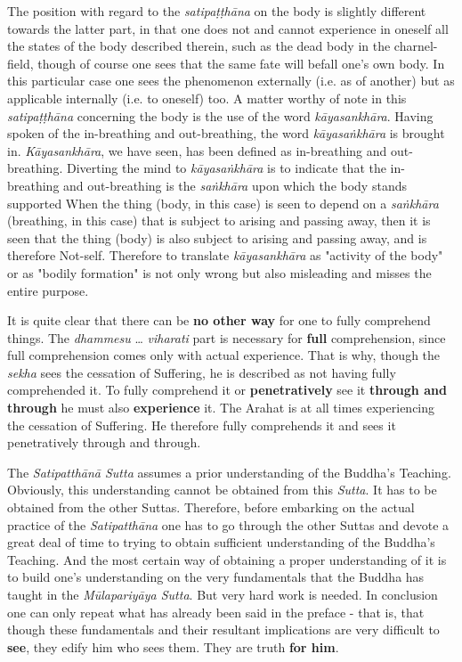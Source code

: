 The position with regard to the \emph{satipaṭṭhāna} on the body is slightly different towards the latter part, in that one does not and cannot experience in oneself all the states of the body described therein, such as the dead body in the charnel-field, though of course one sees that the same fate will befall one's own body. In this particular case one sees the phenomenon externally (i.e. as of another) but as applicable internally (i.e. to oneself) too. A matter worthy of note in this \emph{satipaṭṭhāna} concerning the body is the use of the word \emph{kāyasankhāra}. Having spoken of the in-breathing and out-breathing, the word \emph{kāyasaṅkhāra} is brought in. \emph{Kāyasankhāra}, we have seen, has been defined as in-breathing and out-breathing. Diverting the mind to \emph{kāyasaṅkhāra} is to indicate that the in-breathing and out-breathing is the \emph{saṅkhāra} upon which the body stands supported When the thing (body, in this case) is seen to depend on a \emph{saṅkhāra} (breathing, in this case) that is subject to arising and passing away, then it is seen that the thing (body) is also subject to arising and passing away, and is therefore Not-self. Therefore to translate \emph{kāyasankhāra} as "activity of the body" or as "bodily formation" is not only wrong but also misleading and misses the entire purpose.

It is quite clear that there can be \textbf{no other way} for one to fully comprehend things. The \emph{dhammesu} \ldots\hspace{0pt} \emph{viharati} part is necessary for \textbf{full} comprehension, since full comprehension comes only with actual experience. That is why, though the \emph{sekha} sees the cessation of Suffering, he is described as not having fully comprehended it. To fully comprehend it or \textbf{penetratively} see it \textbf{through and through} he must also \textbf{experience} it. The Arahat is at all times experiencing the cessation of Suffering. He therefore fully comprehends it and sees it penetratively through and through.

\protect\hypertarget{truth-for-him}{}{}The \emph{Satipatthānā Sutta} assumes a prior understanding of the Buddha's Teaching. Obviously, this understanding cannot be obtained from this \emph{Sutta}. It has to be obtained from the other Suttas. Therefore, before embarking on the actual practice of the \emph{Satipatthāna} one has to go through the other Suttas and devote a great deal of time to trying to obtain sufficient understanding of the Buddha's Teaching. And the most certain way of obtaining a proper understanding of it is to build one's understanding on the very fundamentals that the Buddha has taught in the \emph{Mūlapariyāya Sutta}. But very hard work is needed. In conclusion one can only repeat what has already been said in the preface - that is, that though these fundamentals and their resultant implications are very difficult to \textbf{see}, they edify him who sees them. They are truth \textbf{for him}.
